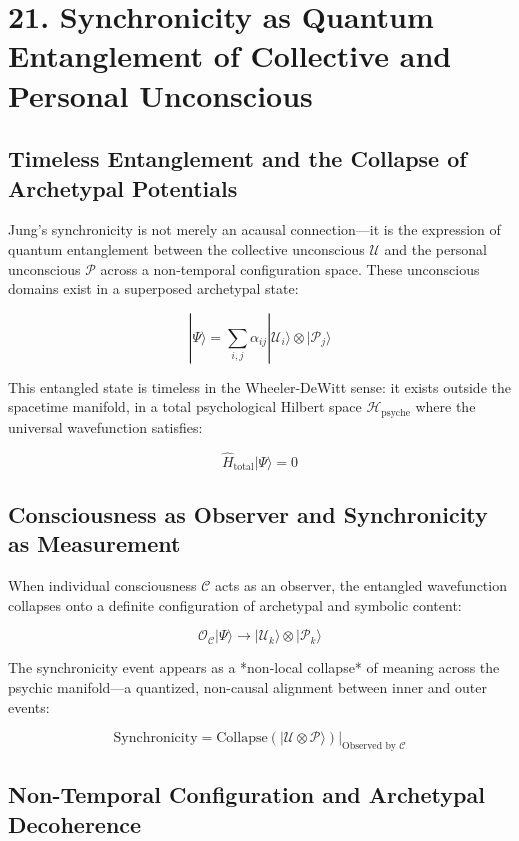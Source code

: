 \documentclass[12pt]{article}
\begin{document}
\section*{21. Synchronicity as Quantum Entanglement of Collective and Personal Unconscious}

\subsection*{Timeless Entanglement and the Collapse of Archetypal Potentials}

Jung’s synchronicity is not merely an acausal connection—it is the expression of quantum entanglement between the collective unconscious $\mathcal{U}$ and the personal unconscious $\mathcal{P}$ across a non-temporal configuration space. These unconscious domains exist in a superposed archetypal state:

\[
|\Psi\rangle = \sum_{i,j} \alpha_{ij} |\mathcal{U}_i\rangle \otimes |\mathcal{P}_j\rangle
\]

This entangled state is timeless in the Wheeler-DeWitt sense: it exists outside the spacetime manifold, in a total psychological Hilbert space $\mathcal{H}_\text{psyche}$ where the universal wavefunction satisfies:

\[
\hat{H}_{\text{total}} |\Psi\rangle = 0
\]

\subsection*{Consciousness as Observer and Synchronicity as Measurement}

When individual consciousness $\mathcal{C}$ acts as an observer, the entangled wavefunction collapses onto a definite configuration of archetypal and symbolic content:

\[
\mathcal{O}_\mathcal{C} |\Psi\rangle \rightarrow |\mathcal{U}_k\rangle \otimes |\mathcal{P}_k\rangle
\]

The synchronicity event appears as a *non-local collapse* of meaning across the psychic manifold—a quantized, non-causal alignment between inner and outer events:

\[
\text{Synchronicity} = \text{Collapse}\left( |\mathcal{U} \otimes \mathcal{P}\rangle \right) \Big|_{\text{Observed by } \mathcal{C}}
\]

\subsection*{Non-Temporal Configuration and Archetypal Decoherence}
\end{document}

